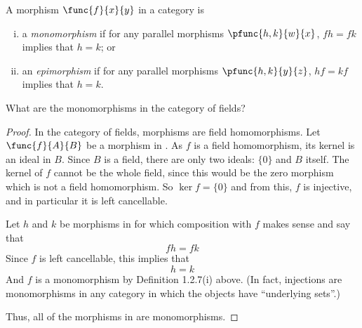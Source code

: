 \documentclass[main.tex]{subfiles}
\begin{document}
\begin{definition}
	A morphism \(\func{f}{x}{y}\) in a category is
	\begin{enumerate}[(i)]
		\item a \emph{monomorphism} if for any parallel morphisms
		\(\pfunc{h,k}{w}{x}\), \(fh=fk\) implies that \(h=k\); or
		\item an \emph{epimorphism} if for any parallel morphisms
		\(\pfunc{h,k}{y}{z}\), \(hf=kf\) implies that \(h=k\).
	\end{enumerate}
\end{definition}
\popthm

\begin{exercise}
	What are the monomorphisms in the category of fields?
\end{exercise}
\begin{proof}
In the category of fields, morphisms are field homomorphisms. Let
\(\func{f}{A}{B}\) be a morphism in \Field. As \(f\) is a field homomorphism,
its kernel is an ideal in \(B\). Since \(B\) is a field, there are only two
ideals: \(\{0\}\) and \(B\) itself. The kernel of \(f\) cannot be the whole
field, since this would be the zero morphism which is not a field homomorphism.
So \(\ker f = \{0\}\) and from this, \(f\) is injective, and in particular it is
left cancellable.

Let \(h\) and \(k\) be morphisms in \Field for which composition with \(f\)
makes sense and say that \[fh = fk\] Since \(f\) is left cancellable, this
implies that \[h = k\] And \(f\) is a monomorphism by Definition 1.2.7(i) above.
(In fact, injections are monomorphisms in any category in which the objects have
``underlying sets''.)

Thus, all of the morphisms in \Field are monomorphisms.
\end{proof}
\end{document}
